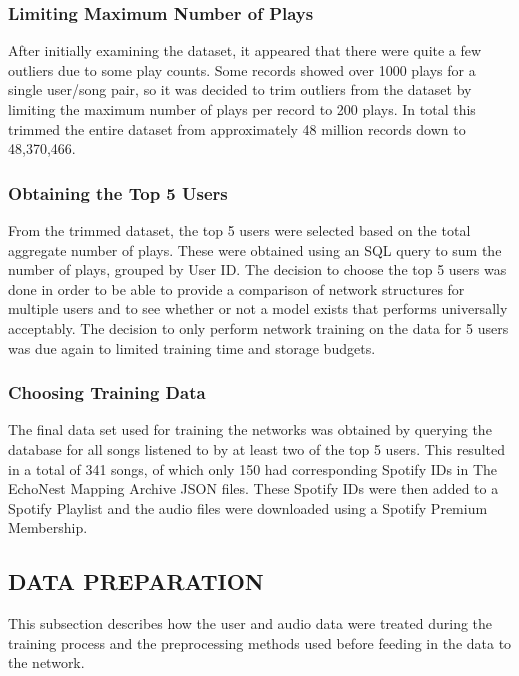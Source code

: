         \subsubsection{Limiting Maximum Number of Plays}
        After initially examining the dataset, it appeared that there were quite a few outliers due to some play counts. Some records showed over 1000 plays for a single user/song pair, so it was decided to trim outliers from the dataset by limiting the maximum number of plays per record to 200 plays. In total this trimmed the entire dataset from approximately 48 million records down to 48,370,466.
        \subsubsection{Obtaining the Top 5 Users}
        From the trimmed dataset, the top 5 users were selected based on the total aggregate number of plays. These were obtained using an SQL query to sum the number of plays, grouped by User ID. The decision to choose the top 5 users was done in order to be able to provide a comparison of network structures for multiple users and to see whether or not a model exists that performs universally acceptably. The decision to only perform network training on the data for 5 users was due again to limited training time and storage budgets.
        \subsubsection{Choosing Training Data}
        The final data set used for training the networks was obtained by querying the database for all songs listened to by at least two of the top 5 users. This resulted in a total of 341 songs, of which only 150 had corresponding Spotify IDs in The EchoNest Mapping Archive JSON files. These Spotify IDs were then added to a Spotify Playlist and the audio files were downloaded using a Spotify Premium Membership.
        
    \subsection{DATA PREPARATION}
    This subsection describes how the user and audio data were treated during the training process and the preprocessing methods used before feeding in the data to the network.

